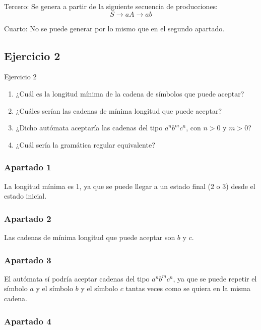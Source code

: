 Tercero:
Se genera a partir de la siguiente secuencia de producciones:
$$ S \to aA \to ab $$

Cuarto:
No se puede generar por lo mismo que en el segundo apartado.

\subsection{Ejercicio 2}

\begin{exercisebox}{Ejercicio 2}


    \begin{enumerate}
        \item ¿Cuál es la longitud mínima de la cadena de símbolos que puede
        aceptar?
        \item ¿Cuáles serían las cadenas de mínima longitud que puede aceptar?
        \item ¿Dicho autómata aceptaría las cadenas del tipo $a^n b^m c^n$, con
        $n > 0$ y $m > 0$?
        \item ¿Cuál sería la gramática regular equivalente?
    \end{enumerate}
\end{exercisebox}

\subsubsection*{Apartado 1}

La longitud mínima es 1, ya que se puede llegar a un estado final (2 o 3)
desde el estado inicial.

\subsubsection*{Apartado 2}

Las cadenas de mínima longitud que puede aceptar son $b$ y $c$.

\subsubsection*{Apartado 3}

El autómata sí podría aceptar cadenas del tipo $a^n b^m c^n$, ya que se
puede repetir el símbolo $a$ y el símbolo $b$ y el símbolo $c$ tantas
veces como se quiera en la misma cadena.

\subsubsection*{Apartado 4}

